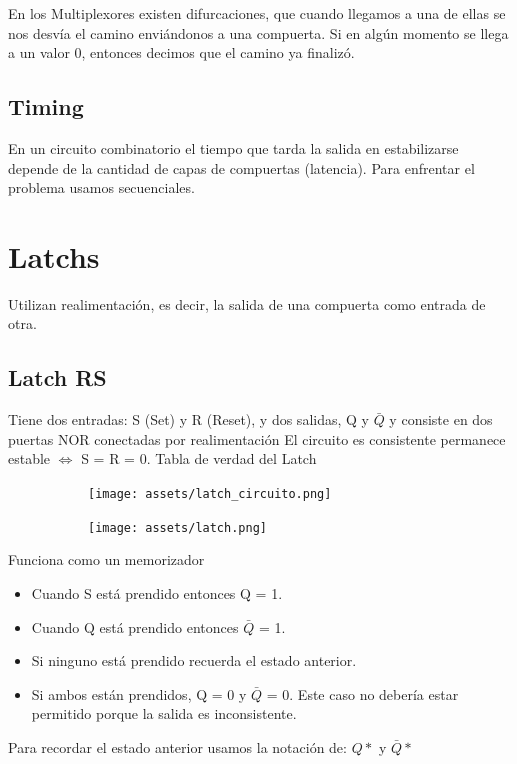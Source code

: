 \documentclass[10pt,a4paper]{article}
\begin{document}
En los Multiplexores existen difurcaciones, que cuando llegamos a una de ellas se nos desvía el camino enviándonos a una compuerta. Si en algún momento se llega a un valor 0, entonces decimos que el camino ya finalizó.\\
\subsection*{Timing}
En un circuito combinatorio el tiempo que tarda la salida en estabilizarse depende de la cantidad de capas de compuertas (latencia). Para enfrentar el problema usamos secuenciales.
\section*{Latchs}
Utilizan realimentación, es decir, la salida de una compuerta como entrada de otra.
\subsection*{Latch RS}
Tiene dos entradas: S (Set) y R (Reset), y dos salidas, Q y \(\bar{Q}\) y consiste en dos puertas NOR conectadas por realimentación
El circuito es consistente permanece estable \(\iff\) S = R = 0.
Tabla de verdad del Latch
\begin{figure}[h]
    \begin{subfigure}{0.4\textwidth}
        \centering
        \texttt{[image: assets/latch\_circuito.png]}
        \label{fig:latch_circuito}
        \end{subfigure}
    \begin{subfigure}{0.5\textwidth}
        \centering
    \texttt{[image: assets/latch.png]}
    \label{fig:latch}
    \end{subfigure}
    \end{figure}
    

Funciona como un memorizador
\begin{itemize}
    \item Cuando S está prendido entonces Q = 1.
    \item Cuando Q está prendido entonces \(\bar{Q}\) = 1.
    \item Si ninguno está prendido recuerda el estado anterior. 
    \item Si ambos están prendidos, Q = 0 y \(\bar{Q}\) = 0. Este caso no debería estar permitido porque la salida es inconsistente.
\end{itemize}

Para recordar el estado anterior usamos la notación de: \(Q \ast\) y \(\bar{Q} \ast \) \\
\end{document}
